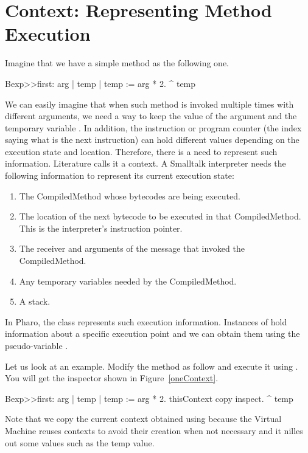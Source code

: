 \documentclass[a4paper,10pt,twoside]{book}
\begin{document}
\section{Context: Representing Method Execution}
Imagine that we have a simple method as the following one.

\begin{code}{}
Bexp>>first: arg
	| temp |
	temp := arg * 2.
	^ temp
\end{code}

We can easily imagine that when such method is invoked multiple times with different arguments, we need a way to keep
the value of the argument  and the temporary variable . In addition, the instruction or program counter (the index saying what is the next instruction) can hold different values depending on the execution state and location. Therefore, there is a need to represent such information. Literature calls it a context. A Smalltalk interpreter needs the following information to represent its current execution state:
\begin{enumerate}
\item The CompiledMethod whose bytecodes are being executed.
\item The location of the next bytecode to be executed in that
CompiledMethod. This is the interpreter's instruction pointer.
\item The receiver and arguments of the message that invoked the
CompiledMethod.
\item Any temporary variables needed by the CompiledMethod.
\item A stack.
\end{enumerate}



In Pharo, the class  represents such execution information. Instances of  hold information about a specific execution point and we can obtain them using the pseudo-variable .

Let us look at an example. Modify the method as follow and execute it using .
You will get the inspector shown in Figure~\ref{oneContext}.

\begin{code}
Bexp>>first: arg
	| temp |
	temp := arg * 2.
	thisContext copy inspect.
	^ temp
\end{code}

Note that we copy the current context obtained using  because the Virtual Machine reuses contexts to avoid their creation when not necessary and it nilles out some values such as the temp value.
\end{document}
